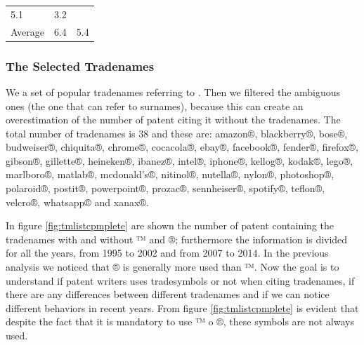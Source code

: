 \documentclass[]{book}
\theoremstyle{definition}
\theoremstyle{definition}
\theoremstyle{definition}
\theoremstyle{remark}
\begin{document}
\begin{longtable}[]{@{}lll@{}}
\begin{minipage}[t]{0.39\columnwidth}
5.1\strut
\end{minipage} & \begin{minipage}[t]{0.39\columnwidth}\raggedright\strut
3.2\strut
\end{minipage}\tabularnewline
\begin{minipage}[t]{0.13\columnwidth}\raggedright\strut
Average\strut
\end{minipage} & \begin{minipage}[t]{0.39\columnwidth}\raggedright\strut
6.4\strut
\end{minipage} & \begin{minipage}[t]{0.39\columnwidth}\raggedright\strut
5.4\strut
\end{minipage}\tabularnewline
\bottomrule
\end{longtable}

\subsubsection*{The Selected Tradenames}\label{the-selected-tradenames}

We a set of popular tradenames referring to
\citep{morris2016trademarks}. Then we filtered the ambiguous ones (the
one that can refer to surnames), because this can create an
overestimation of the number of patent citing it without the tradenames.
The total number of tradenames is 38 and these are: amazon®,
blackberry®, bose®, budweiser®, chiquita®, chrome®, cocacola®, ebay®,
facebook®, fender®, firefox®, gibson®, gillette®, heineken®, ibanez®,
intel®, iphone®, kellog®, kodak®, lego®, marlboro®, matlab®,
mcdonald's®, nitinol®, nutella®, nylon®, photoshop®, polaroid®, postit®,
powerpoint®, prozac®, sennheiser®, spotify®, teflon®, velcro®, whatsapp®
and xanax®.

In figure \ref{fig:tmlistcpmplete} are shown the number of patent
containing the tradenames with and without ™ and ®; furthermore the
information is divided for all the years, from 1995 to 2002 and from
2007 to 2014. In the previous analysis we noticed that ® is generally
more used than ™. Now the goal is to understand if patent writers uses
tradesymbols or not when citing tradenames, if there are any differences
between different tradenames and if we can notice different behaviors in
recent years. From figure \ref{fig:tmlistcpmplete} is evident that
despite the fact that it is mandatory to use ™ o ®, these symbols are
not always used.
\end{document}
